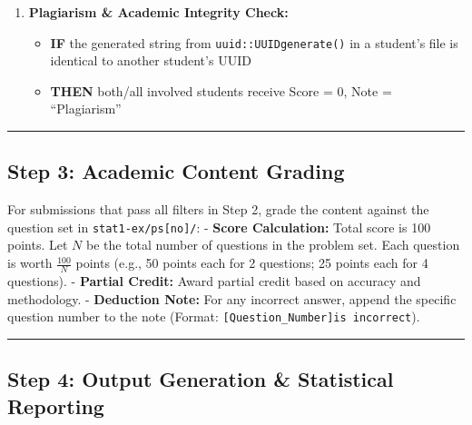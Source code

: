 \documentclass[
]{article}
\providecommand{\tightlist}{%
  \setlength{\itemsep}{0pt}\setlength{\parskip}{0pt}}
\begin{document}
\begin{enumerate}
\begin{itemize}
\begin{verbatim}
## [1] "005b8221-4b15-4444-916b-5a91b913487c"
\end{verbatim}
  \item
    \textbf{THEN} Score = 0, Note = ``Incorrect Internal Format''
  \end{itemize}
\item
  \textbf{Plagiarism \& Academic Integrity Check:}

  \begin{itemize}
  \tightlist
  \item
    \textbf{IF} the generated string from \texttt{uuid::UUIDgenerate()}
    in a student's file is identical to another student's UUID
  \item
    \textbf{THEN} both/all involved students receive Score = 0, Note =
    ``Plagiarism''
  \end{itemize}
\end{enumerate}

\begin{center}\rule{0.5\linewidth}{0.5pt}\end{center}

\subsection{Step 3: Academic Content
Grading}\label{step-3-academic-content-grading}

For submissions that pass all filters in Step 2, grade the content
against the question set in \texttt{stat1-ex/ps{[}no{]}/}: -
\textbf{Score Calculation:} Total score is 100 points. Let \(N\) be the
total number of questions in the problem set. Each question is worth
\(\frac{100}{N}\) points (e.g., 50 points each for 2 questions; 25
points each for 4 questions). - \textbf{Partial Credit:} Award partial
credit based on accuracy and methodology. - \textbf{Deduction Note:} For
any incorrect answer, append the specific question number to the note
(Format: \texttt{{[}Question\_Number{]}is\ incorrect}).

\begin{center}\rule{0.5\linewidth}{0.5pt}\end{center}

\subsection{Step 4: Output Generation \& Statistical
Reporting}\label{step-4-output-generation-statistical-reporting}
\end{document}
